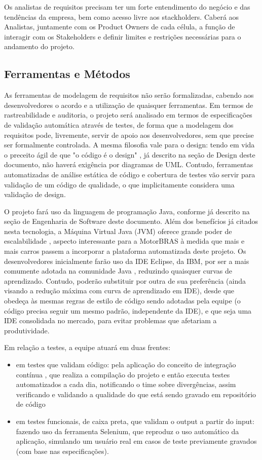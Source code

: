 \documentclass[12pt,journal,compsoc]{IEEEtran}
\begin{document}
Os analistas de requisitos precisam ter um forte entendimento do negócio e das tendências da empresa, bem como acesso livre aos stackholders. Caberá aos Analistas, juntamente com os Product Owners de cada célula, a função de interagir com os Stakeholders e definir limites e restrições necessárias para o andamento do projeto.


\subsection{Ferramentas e Métodos}

As ferramentas de modelagem de requisitos não serão formalizadas, cabendo aos desenvolvedores o acordo e a utilização de quaisquer ferramentas. Em termos de rastreabilidade e auditoria, o projeto será analisado em termos de especificações de validação automática através de testes, de forma que a modelagem dos requisitos pode, livremente, servir de apoio aos desenvolvedores, sem que precise ser formalmente controlada. A mesma filosofia vale para o design: tendo em vida o preceito ágil de que "o código é o design" \cite{fowler_design_dead}, já descrito na seção de Design deste documento, não haverá exigência por diagramas de UML. Contudo, ferramentas automatizadas de análise estática de código e cobertura de testes vão servir para validação de um código de qualidade, o que implicitamente considera uma validação de design.

O projeto fará uso da linguagem de programação Java, conforme já descrito na seção de Engenharia de Software deste documento. Além dos benefícios já citados nesta tecnologia, a Máquina Virtual Java (JVM) oferece grande poder de escalabilidade \cite{10.1109/IISWC.2005.1526008}, aspecto interessante para a MotorBRAS à medida que mais e mais carros passem a incorporar a plataforma automatizada deste projeto. Os desenvolvedores inicialmente farão uso da IDE Eclipse, da IBM, por ser a mais comumente adotada na comunidade Java \cite{java_report_2012}, reduzindo quaisquer curvas de aprendizado. Contudo, poderão substituir por outra de sua preferência (ainda visando a redução máxima com curva de aprendizado em IDE), desde que obedeça às mesmas regras de estilo de código sendo adotadas pela equipe (o código precisa seguir um mesmo padrão, independente da IDE), e que seja uma IDE consolidada no mercado, para evitar problemas que afetariam a produtividade.   

Em relação a testes, a equipe atuará em duas frentes: 
\begin{itemize}
\item em testes que validam código: pela aplicação do conceito de integração contínua \cite{ci_fowler}, que realiza a compilação do projeto e então executa testes automatizados a cada dia, notificando o time sobre divergências, assim verificando e validando a qualidade do que está sendo gravado em repositório de código
\item em testes funcionais, de caixa preta, que validam o output a partir do input: fazendo uso da ferramenta Selenium, que reproduz o uso automático da aplicação, simulando um usuário real em casos de teste previamente gravados (com base nas especificações). 
\end{itemize}
\end{document}
